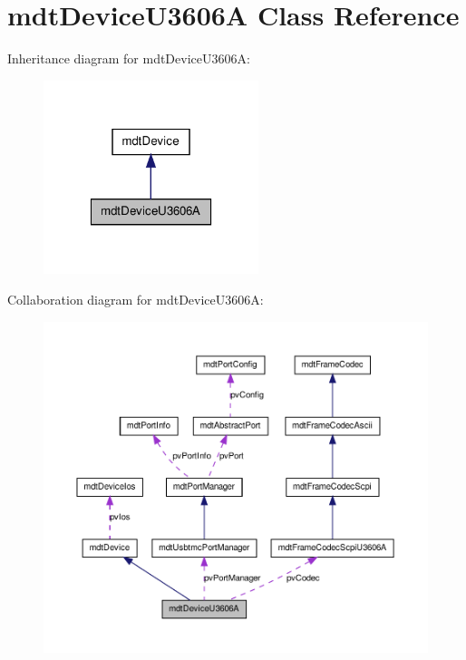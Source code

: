 \hypertarget{classmdt_device_u3606_a}{
\section{mdtDeviceU3606A Class Reference}
\label{classmdt_device_u3606_a}
}


Inheritance diagram for mdtDeviceU3606A:
\nopagebreak
\begin{figure}[H]
\begin{center}
\leavevmode
\includegraphics[width=178pt]{classmdt_device_u3606_a__inherit__graph}
\end{center}
\end{figure}


Collaboration diagram for mdtDeviceU3606A:
\nopagebreak
\begin{figure}[H]
\begin{center}
\leavevmode
\includegraphics[width=400pt]{classmdt_device_u3606_a__coll__graph}
\end{center}
\end{figure}
